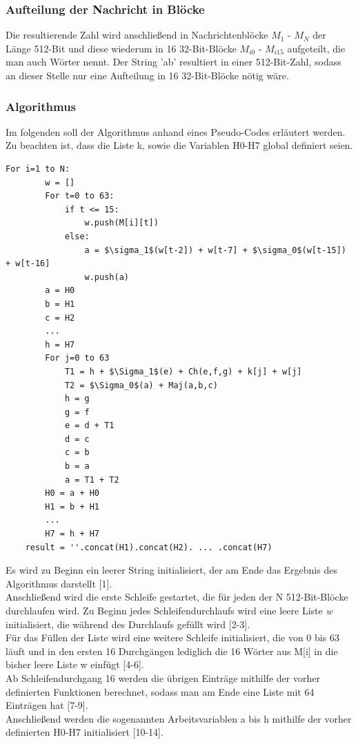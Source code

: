 \subsubsection{Aufteilung der Nachricht in Blöcke}
Die resultierende Zahl wird anschließend in Nachrichtenblöcke $M_1$ - $M_N$ der Länge 512-Bit und diese wiederum in 16 32-Bit-Blöcke $M_{i0}$ - $M_{i15}$ aufgeteilt, die man auch Wörter nennt. Der String 'ab' resultiert in einer 512-Bit-Zahl, sodass an dieser Stelle nur eine Aufteilung in 16 32-Bit-Blöcke nötig wäre.

\subsubsection{Algorithmus}
Im folgenden soll der Algorithmus anhand eines Pseudo-Codes erläutert werden. Zu beachten ist, dass die Liste k, sowie die Variablen H0-H7 global definiert seien.
\begin{lstlisting}[mathescape,caption={Pseudocode zu SHA256},captionpos=b]
	For i=1 to N:
		w = []
		For t=0 to 63:
			if t <= 15:
				w.push(M[i][t])
			else:
				a = $\sigma_1$(w[t-2]) + w[t-7] + $\sigma_0$(w[t-15]) + w[t-16]
				w.push(a)
		a = H0
		b = H1
		c = H2
		...
		h = H7
		For j=0 to 63
			T1 = h + $\Sigma_1$(e) + Ch(e,f,g) + k[j] + w[j]
			T2 = $\Sigma_0$(a) + Maj(a,b,c)
			h = g
			g = f
			e = d + T1
			d = c
			c = b
			b = a
			a = T1 + T2
		H0 = a + H0
		H1 = b + H1
		...
		H7 = h + H7
	result = ''.concat(H1).concat(H2). ... .concat(H7)
\end{lstlisting}
Es wird zu Beginn ein leerer String initialisiert, der am Ende das Ergebnis des Algorithmus darstellt [1].\\
Anschließend wird die erste Schleife gestartet, die für jeden der N 512-Bit-Blöcke durchlaufen wird. Zu Beginn jedes Schleifendurchlaufs wird eine leere Liste \emph{w} initialisiert, die während des Durchlaufs gefüllt wird [2-3].\\
Für das Füllen der Liste wird eine weitere Schleife initialisiert, die von 0 bis 63 läuft und in den ersten 16 Durchgängen lediglich die 16 Wörter aus M[i] in die bisher leere Liste w einfügt [4-6]. \\
Ab Schleifendurchgang 16 werden die übrigen Einträge mithilfe der vorher definierten Funktionen berechnet, sodass man am Ende eine Liste mit 64 Einträgen hat [7-9].\\
Anschließend werden die sogenannten Arbeitsvariablen a bis h mithilfe der vorher definierten H0-H7 initialisiert [10-14].\\
